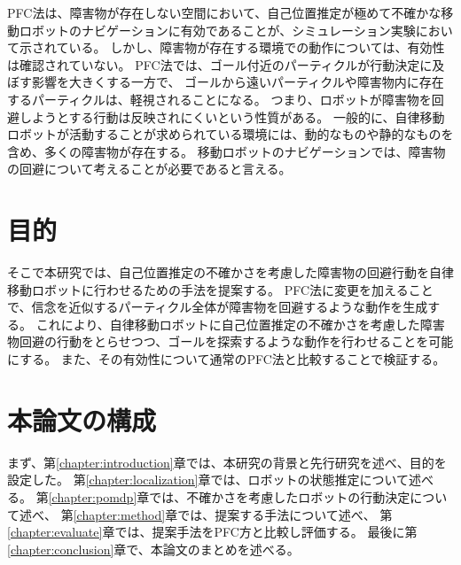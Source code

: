 PFC法は、障害物が存在しない空間において、自己位置推定が極めて不確かな移動ロボットのナビゲーションに有効であることが、シミュレーション実験において示されている。
しかし、障害物が存在する環境での動作については、有効性は確認されていない。
PFC法では、ゴール付近のパーティクルが行動決定に及ぼす影響を大きくする一方で、
ゴールから遠いパーティクルや障害物内に存在するパーティクルは、軽視されることになる。
つまり、ロボットが障害物を回避しようとする行動は反映されにくいという性質がある。
一般的に、自律移動ロボットが活動することが求められている環境には、動的なものや静的なものを含め、多くの障害物が存在する。
移動ロボットのナビゲーションでは、障害物の回避について考えることが必要であると言える。


\section{目的}
そこで本研究では、自己位置推定の不確かさを考慮した障害物の回避行動を自律移動ロボットに行わせるための手法を提案する。
PFC法に変更を加えることで、信念を近似するパーティクル全体が障害物を回避するような動作を生成する。
これにより、自律移動ロボットに自己位置推定の不確かさを考慮した障害物回避の行動をとらせつつ、ゴールを探索するような動作を行わせることを可能にする。
また、その有効性について通常のPFC法と比較することで検証する。


\section{本論文の構成}
まず、第\ref{chapter:introduction}章では、本研究の背景と先行研究を述べ、目的を設定した。
第\ref{chapter:localization}章では、ロボットの状態推定について述べる。
第\ref{chapter:pomdp}章では、不確かさを考慮したロボットの行動決定について述べ、
第\ref{chapter:method}章では、提案する手法について述べ、
第\ref{chapter:evaluate}章では、提案手法をPFC方と比較し評価する。
最後に第\ref{chapter:conclusion}章で、本論文のまとめを述べる。


